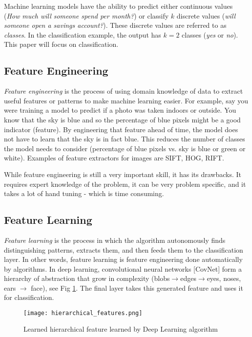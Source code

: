 Machine learning models have the ability to predict either continuous values (\textit{How much will someone spend per month?}) or classify $k$ discrete values (\textit{will someone open a savings account?}).   These discrete values are referred to as \emph{classes}.  In the classification example, the output has $k = 2$ classes (\textit{yes} or \textit{no}). This paper will focus on classification.

\subsection{Feature Engineering}
\emph{Feature engineering} is the process of using domain knowledge of data to extract useful features or patterns to make machine learning easier.  For example, say you were training a model to predict if a photo was taken indoors or outside.  You know that the sky is blue and so the percentage of blue pixels might be a good indicator (feature).  By engineering that feature ahead of time, the model does not have to learn that the sky is in fact blue.  This reduces the number of classes the model needs to consider (percentage of blue pixels vs. sky is blue or green or white).  Examples of feature extractors for images are SIFT, HOG, RIFT.  
%
%
%

While feature engineering is still a very important skill, it has its drawbacks.  It requires expert knowledge of the problem, it can be very problem specific, and it takes a lot of hand tuning - which is time consuming.  
\subsection{Feature Learning}
\emph{Feature learning} is the process in which the algorithm autonomously finds distinguishing patterns, extracts them, and then feeds them to the classification layer.  In other words, feature learning is feature engineering done automatically by algorithms.  In deep learning, convolutional neural networks [CovNet] form a hierarchy of abstraction that grow in complexity (blobs$\rightarrow$edges$\rightarrow$eyes, noses, ears $\rightarrow$ face), see Fig \ref{fig:FeatLearn}.  The final layer takes this generated feature and uses it for classification.\cite{NvidiaConcepts} 

\begin{figure}[!h]
 \begin{center}
 \texttt{[image: hierarchical\_features.png]}
 \caption{Learned hierarchical feature learned by Deep Learning algorithm\cite{NvidiaConcepts}}
 \label{fig:FeatLearn}
 \end{center}
 \end{figure}

